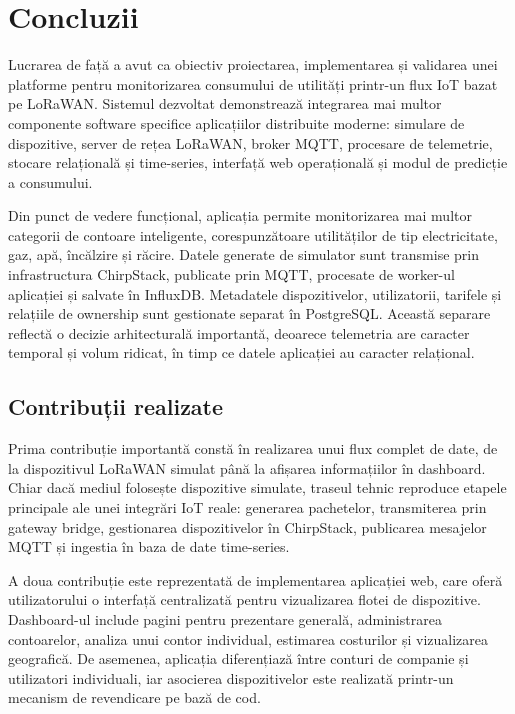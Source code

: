 \chapter{Concluzii}
\pagestyle{fancy}

Lucrarea de față a avut ca obiectiv proiectarea, implementarea și validarea unei platforme pentru monitorizarea consumului de utilități printr-un flux IoT bazat pe LoRaWAN. Sistemul dezvoltat demonstrează integrarea mai multor componente software specifice aplicațiilor distribuite moderne: simulare de dispozitive, server de rețea LoRaWAN, broker MQTT, procesare de telemetrie, stocare relațională și time-series, interfață web operațională și modul de predicție a consumului.

Din punct de vedere funcțional, aplicația permite monitorizarea mai multor categorii de contoare inteligente, corespunzătoare utilităților de tip electricitate, gaz, apă, încălzire și răcire. Datele generate de simulator sunt transmise prin infrastructura ChirpStack, publicate prin MQTT, procesate de worker-ul aplicației și salvate în InfluxDB. Metadatele dispozitivelor, utilizatorii, tarifele și relațiile de ownership sunt gestionate separat în PostgreSQL. Această separare reflectă o decizie arhitecturală importantă, deoarece telemetria are caracter temporal și volum ridicat, în timp ce datele aplicației au caracter relațional.

\section{Contribuții realizate}

Prima contribuție importantă constă în realizarea unui flux complet de date, de la dispozitivul LoRaWAN simulat până la afișarea informațiilor în dashboard. Chiar dacă mediul folosește dispozitive simulate, traseul tehnic reproduce etapele principale ale unei integrări IoT reale: generarea pachetelor, transmiterea prin gateway bridge, gestionarea dispozitivelor în ChirpStack, publicarea mesajelor MQTT și ingestia în baza de date time-series.

A doua contribuție este reprezentată de implementarea aplicației web, care oferă utilizatorului o interfață centralizată pentru vizualizarea flotei de dispozitive. Dashboard-ul include pagini pentru prezentare generală, administrarea contoarelor, analiza unui contor individual, estimarea costurilor și vizualizarea geografică. De asemenea, aplicația diferențiază între conturi de companie și utilizatori individuali, iar asocierea dispozitivelor este realizată printr-un mecanism de revendicare pe bază de cod.

